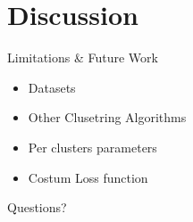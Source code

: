 \section{Discussion}
\begin{frame}{Limitations \& Future Work}
	\begin{itemize}
		\item Datasets
		\item Other Clusetring Algorithms
		\item Per clusters parameters
		\item Costum Loss function
	\end{itemize}
\end{frame}

{
\begin{frame}[standout]
  Questions?
\end{frame}
}
